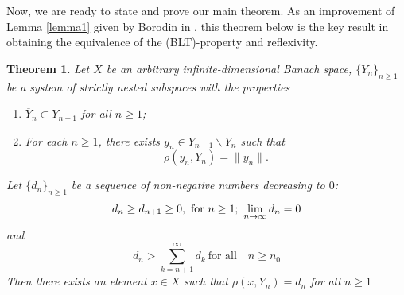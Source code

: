 \documentclass[12pt, reqno]{amsart}
\newtheorem{theorem}{Theorem}[section]
\theoremstyle{definition}
\theoremstyle{remark}
\numberwithin{equation}{section}
\begin{document}
Now, we are ready to state and prove our main  theorem.  As an improvement of Lemma \ref{lemma1} given  by Borodin in \cite{Borodin1}, this theorem below is the key result in obtaining the equivalence of the (BLT)-property and reflexivity.
\begin{theorem} \label{Borodin}
Let $X$ be an arbitrary infinite-dimensional Banach space, $\{Y_n\}_{n\ge1}$ be a system of strictly nested subspaces with the properties
\begin{enumerate}
\item $\overline Y_n \subset Y_{n+1}$ for all $n\ge1$;
\item For each $n\ge1$, there exists $y_n\in Y_{n+1}\backslash Y_n$ such that
\begin{equation}
\label{Yn}
\rho(y_n,Y_n)=\|y_n\|.
\end{equation}
 \end{enumerate}
 Let  $\{d_n\}_{n\ge1}$ be a sequence of non-negative numbers  decreasing to $0$:
 \begin{equation}
\label{condition'}
 d_n\geq d_{n+1}\ge0, \,\,\mbox{for}~ n \ge 1;~\lim_{n\to\infty}d_n=0 \\
 \end{equation}
 and  $$ d_n > \sum_{k = n+1}^\infty d_k~\mbox{for all}\quad n \ge n_0$$
 Then there exists an element $x\in X$ such that $\rho(x,Y_n)=d_n$ for all $n\ge1$ 
\end{theorem}
\end{document}

